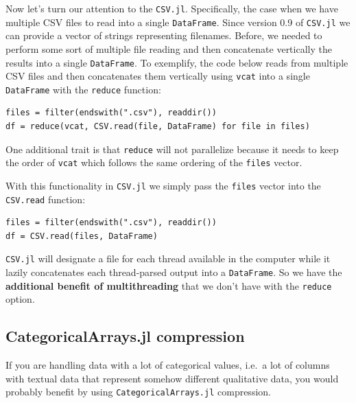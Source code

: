 \documentclass[
  notoc %
]{tufte-book}
\newcommand{\passthrough}[1]{#1}
\begin{document}
Now let's turn our attention to the \passthrough{\lstinline!CSV.jl!}.
Specifically, the case when we have multiple CSV files to read into a
single \passthrough{\lstinline!DataFrame!}. Since version 0.9 of
\passthrough{\lstinline!CSV.jl!} we can provide a vector of strings
representing filenames. Before, we needed to perform some sort of
multiple file reading and then concatenate vertically the results into a
single \passthrough{\lstinline!DataFrame!}. To exemplify, the code below
reads from multiple CSV files and then concatenates them vertically
using \passthrough{\lstinline!vcat!} into a single
\passthrough{\lstinline!DataFrame!} with the
\passthrough{\lstinline!reduce!} function:

\begin{lstlisting}
files = filter(endswith(".csv"), readdir())
df = reduce(vcat, CSV.read(file, DataFrame) for file in files)
\end{lstlisting}

One additional trait is that \passthrough{\lstinline!reduce!} will not
parallelize because it needs to keep the order of
\passthrough{\lstinline!vcat!} which follows the same ordering of the
\passthrough{\lstinline!files!} vector.

With this functionality in \passthrough{\lstinline!CSV.jl!} we simply
pass the \passthrough{\lstinline!files!} vector into the
\passthrough{\lstinline!CSV.read!} function:

\begin{lstlisting}
files = filter(endswith(".csv"), readdir())
df = CSV.read(files, DataFrame)
\end{lstlisting}

\passthrough{\lstinline!CSV.jl!} will designate a file for each thread
available in the computer while it lazily concatenates each
thread-parsed output into a \passthrough{\lstinline!DataFrame!}. So we
have the \textbf{additional benefit of multithreading} that we don't
have with the \passthrough{\lstinline!reduce!} option.

\hypertarget{sec:df_performance_categorical_compression}{%
\subsection{CategoricalArrays.jl
compression}\label{sec:df_performance_categorical_compression}}

If you are handling data with a lot of categorical values, i.e.~a lot of
columns with textual data that represent somehow different qualitative
data, you would probably benefit by using
\passthrough{\lstinline!CategoricalArrays.jl!} compression.
\end{document}

